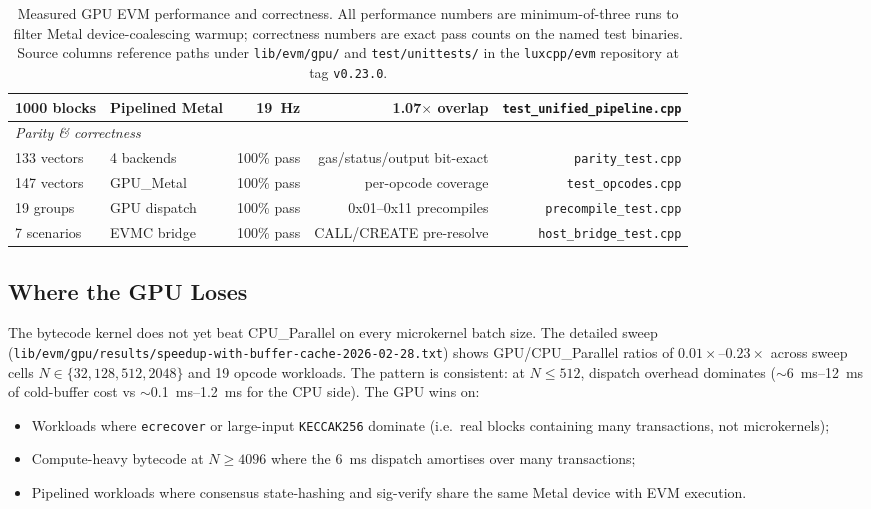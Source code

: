\begin{table}[h]
\begin{tabular}{llrrr}
1000 blocks     & Pipelined Metal & \SI{19}{\hertz}          & 1.07$\times$ overlap & \texttt{test\_unified\_pipeline.cpp} \\
\midrule
\multicolumn{5}{l}{\textit{Parity \& correctness}} \\
133 vectors     & 4 backends     & 100\% pass               & gas/status/output bit-exact & \texttt{parity\_test.cpp} \\
147 vectors     & GPU\_Metal     & 100\% pass               & per-opcode coverage & \texttt{test\_opcodes.cpp} \\
19 groups       & GPU dispatch   & 100\% pass               & 0x01--0x11 precompiles & \texttt{precompile\_test.cpp} \\
7 scenarios     & EVMC bridge    & 100\% pass               & CALL/CREATE pre-resolve & \texttt{host\_bridge\_test.cpp} \\
\bottomrule
\end{tabular}
\caption{Measured GPU EVM performance and correctness. All performance
numbers are minimum-of-three runs to filter Metal device-coalescing
warmup; correctness numbers are exact pass counts on the named test
binaries. Source columns reference paths under
\texttt{lib/evm/gpu/} and \texttt{test/unittests/} in the
\texttt{luxcpp/evm} repository at tag \texttt{v0.23.0}.}
\label{tab:empirical}
\end{table}

\subsection{Where the GPU Loses}

The bytecode kernel does not yet beat CPU\_Parallel on every microkernel
batch size. The detailed sweep
(\texttt{lib/evm/gpu/results/speedup-with-buffer-cache-2026-02-28.txt})
shows GPU/CPU\_Parallel ratios of $0.01\times$--$0.23\times$ across
sweep cells $N \in \{32, 128, 512, 2048\}$ and 19 opcode workloads.
The pattern is consistent: at $N \le 512$, dispatch overhead dominates
($\sim$\SI{6}{\milli\second}--\SI{12}{\milli\second} of cold-buffer
cost vs $\sim$\SI{0.1}{\milli\second}--\SI{1.2}{\milli\second} for
the CPU side). The GPU wins on:

\begin{itemize}
  \item Workloads where \texttt{ecrecover} or large-input
    \texttt{KECCAK256} dominate (i.e.\ real blocks containing many
    transactions, not microkernels);
  \item Compute-heavy bytecode at $N \ge 4096$ where the
    \SI{6}{\milli\second} dispatch amortises over many transactions;
  \item Pipelined workloads where consensus state-hashing and
    sig-verify share the same Metal device with EVM execution.
\end{itemize}


